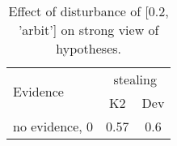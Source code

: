 \begin{table}\begin{tabular}{l|cc}\toprule\multirow{2}{*}{Evidence} & \multicolumn{2}{c}{stealing}\\& {K2} & {Dev}\\\midrule
no evidence, 0 & 0.57&0.6\\\bottomrule\end{tabular}\caption{Effect of disturbance of [0.2, 'arbit'] on strong view of hypotheses.}\end{table}
